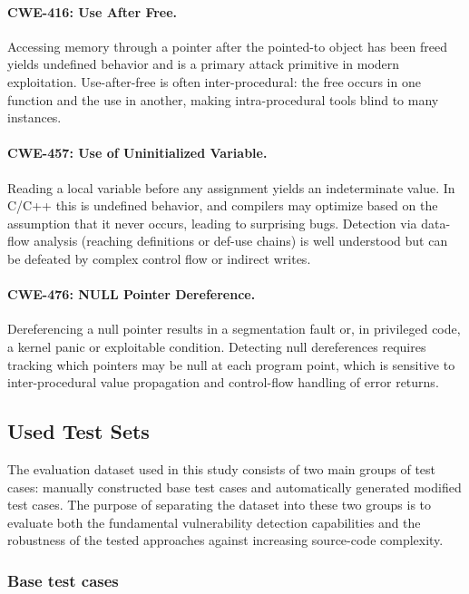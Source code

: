 \documentclass[11pt,a4paper]{article}
\begin{document}
\paragraph{CWE-416: Use After Free.} Accessing memory through a pointer after the pointed-to object has been freed yields undefined behavior and is a primary attack primitive in modern exploitation. Use-after-free is often inter-procedural: the free occurs in one function and the use in another, making intra-procedural tools blind to many instances.

\paragraph{CWE-457: Use of Uninitialized Variable.} Reading a local variable before any assignment yields an indeterminate value. In C/C++ this is undefined behavior, and compilers may optimize based on the assumption that it never occurs, leading to surprising bugs. Detection via data-flow analysis (reaching definitions or def-use chains) is well understood but can be defeated by complex control flow or indirect writes.

\paragraph{CWE-476: NULL Pointer Dereference.} Dereferencing a null pointer results in a segmentation fault or, in privileged code, a kernel panic or exploitable condition. Detecting null dereferences requires tracking which pointers may be null at each program point, which is sensitive to inter-procedural value propagation and control-flow handling of error returns.


\subsection{Used Test Sets}

The evaluation dataset used in this study consists of two main groups of test cases: manually constructed base test cases and automatically generated modified test cases. The purpose of separating the dataset into these two groups is to evaluate both the fundamental vulnerability detection capabilities and the robustness of the tested approaches against increasing source-code complexity.

\subsubsection{Base test cases}
\end{document}
